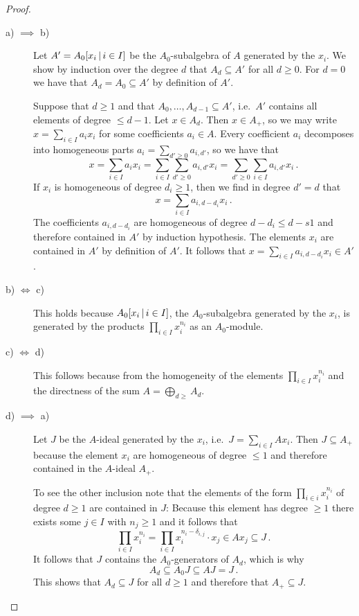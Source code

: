 \begin{proof}
  \leavevmode
  \begin{description}
    \item[a) $\implies$ b)]
      Let $A' = A_0[x_i \suchthat i \in I]$ be the $A_0$-subalgebra of $A$ generated by the $x_i$.
      We show by induction over the degree $d$ that $A_d \subseteq A'$ for all $d \geq 0$.
      For $d = 0$ we have that $A_d = A_0 \subseteq A'$ by definition of $A'$.
      
      Suppose that $d \geq 1$ and that $A_0, \dotsc, A_{d-1} \subseteq A'$, i.e.\ $A'$ contains all elements of degree $\leq d-1$.
      Let $x \in A_d$.
      Then $x \in A_+$, so we may write $x = \sum_{i \in I} a_i x_i$ for some coefficients $a_i \in A$.
      Every coefficient $a_i$ decomposes into homogeneous parts $a_i = \sum_{d' \geq 0} a_{i,d'}$, so we have that
      \[
          x
        = \sum_{i \in I} a_i x_i
        = \sum_{i \in I} \sum_{d' \geq 0} a_{i,d'} x_i
        = \sum_{d' \geq 0} \sum_{i \in I} a_{i,d'} x_i \,.
      \]
      If $x_i$ is homogeneous of degree $d_i \geq 1$, then we find in degree $d' = d$ that
      \[
          x
        = \sum_{i \in I} a_{i,d-d_i} x_i \,.
      \]
      The coefficients $a_{i,d-d_i}$ are homogeneous of degree $d - d_i \leq d - s1$ and therefore contained in $A'$ by induction hypothesis.
      The elements $x_i$ are contained in $A'$ by definition of $A'$.
      It follows that $x = \sum_{i \in I} a_{i,d-d_i} x_i \in A'$.
    \item[b) $\iff$ c)]
      This holds because $A_0[x_i \suchthat i \in I]$, the $A_0$-subalgebra generated by the $x_i$, is generated by the products $\prod_{i \in I} x_i^{n_i}$ as an $A_0$-module.
    \item[c) $\iff$ d)]
      This follows because from the homogeneity of the elements $\prod_{i \in I} x_i^{n_i}$ and the directness of the sum $A = \bigoplus_{d \geq  } A_d$.
    \item[d) $\implies$ a)]
      Let $J$ be the $A$-ideal generated by the $x_i$, i.e.\ $J = \sum_{i \in I} A x_i$.
      Then $J \subseteq A_+$ because the element $x_i$ are homogeneous of degree $\leq 1$ and therefore contained in the $A$-ideal $A_+$.
      
      To see the other inclusion note that the elements of the form $\prod_{i \in i} x_i^{n_i}$ of degree $d \geq 1$ are contained in $J$:
      Because this element has degree $\geq 1$ there exists some $j \in I$ with $n_j \geq 1$ and it follows that
      \[
                  \prod_{i \in I} x_i^{n_i}
        =         \prod_{i \in I} x_i^{n_i - \delta_{i,j}} \cdot x_j
        \in       A x_j
        \subseteq J \,.
      \]
      It follows that $J$ contains the $A_0$-generators of $A_d$, which is why
      \[
                  A_d
        \subseteq A_0 J
        \subseteq A J
        =         J \,.
      \]
      This shows that $A_d \subseteq J$ for all $d \geq 1$ and therefore that $A_+ \subseteq J$.
    \qedhere
  \end{description}
\end{proof}


